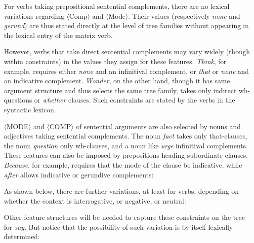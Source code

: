 For verbs taking prepositional sentential complements, there are no
lexical variations regarding $\langle$Comp$\rangle$ and
$\langle$Mode$\rangle$. Their values (respectively {\it none} and {\it gerund}) are thus
stated directly at the level of tree families without appearing in the
lexical entry of the matrix verb.

However, verbs that take direct sentential complements may vary widely (though within
constraints) in the values they assign for these features.  {\it Think}, for example,
requires either {\it none} and an infinitival complement,
or {\it that} or {\it none} and an indicative complement. {\it Wonder}, on the other hand, though it
has same argument structure and thus  selects the same tree family,  takes only indirect 
wh-questions or {\it whether} clauses. Such constraints are stated by the verbs in 
the syntactic lexicon.

$\langle$MODE$\rangle$ and $\langle$COMP$\rangle$ of sentential arguments are  also selected 
by nouns and adjectives taking sentential complements. The noun {\it fact} takes only 
that-clauses, the noun {\it question} only
wh-clauses, and a noun like {\it urge} infinitival complements.
These features can also be imposed by prepositions heading subordinate clauses.
 {\it
Because}, for example, requires that the mode of the clause be
indicative, while {\it after} allows indicative or gerundive complements:

\beginsentences
{}
\endsentences

\beginsentences
{}
\endsentences

As shown below, there are further variations, at least for verbs, depending on 
whether the context is interrogative, or negative, or neutral:

\beginsentences
{}
\endsentences

Other feature structures will be needed to capture these constraints on the tree for {\it say}.
But notice that the possibility of such variation is by itself lexically determined:

\beginsentences
{}
\endsentences





